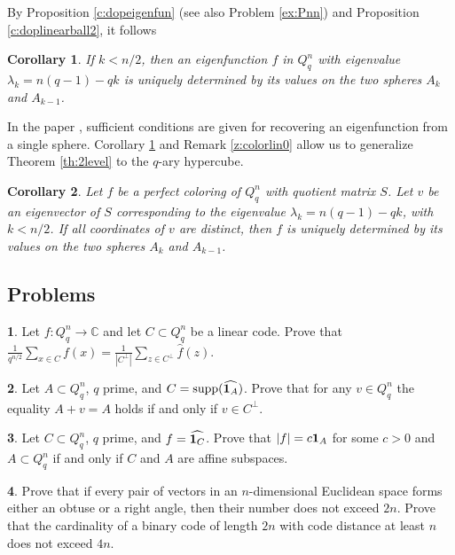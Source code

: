 \documentclass[11pt]{article}
\newtheorem{corollary}{Corollary}[section]
\theoremstyle{definition}
\newtheorem{exercise}{\quad}
\newcommand{\supp}{{\rm supp}}
\begin{document}
{{{By Proposition \ref{c:dopeigenfun}   (see also Problem \ref{ex:Pnn})  and Proposition \ref{c:doplinearball2}, it follows

\begin{corollary}\label{c:doplinearball3}
If $k<n/2$, then an eigenfunction $f$ in $Q^n_q$ with eigenvalue $\lambda_k=n(q-1)-qk$ is uniquely determined by its values on the two spheres $A_{k}$ and $A_{k-1}$.
\end{corollary}

In the paper \cite{Vas15}, sufficient conditions are given for recovering an eigenfunction from a single sphere. Corollary \ref{c:doplinearball3} and Remark \ref{z:colorlin0} allow us to generalize Theorem \ref{th:2level} to the $q$-ary hypercube.


\begin{corollary}
Let $f$ be a perfect coloring of  $Q^n_q$ with quotient matrix $S$. Let $v$ be an eigenvector of $S$ corresponding to the eigenvalue $\lambda_k=n(q-1)-qk$, with $k<n/2$. If all coordinates of $v$ are distinct, then $f$ is uniquely determined by its values on the two spheres $A_{k}$ and $A_{k-1}$.
\end{corollary}


\subsection{Problems}

\begin{exercise}\label{exer2}
Let $f: Q_q^n \rightarrow\mathbb{C}$ and let $C\subset Q_q^n$ be a linear code. Prove that  $\frac{1}{q^{n/2}}\sum\limits_{x\in C}f(x)=\frac{1}{|C^\perp|}\sum\limits_{z\in C^\perp}\widehat{f}(z)$.
\end{exercise}

\begin{exercise}
Let $A\subset Q_q^n$, $q$ prime, and $C=\supp(\widehat{{\bf 1}_A})$. Prove that for any $v\in Q_q^n$ the equality $A+v=A$ holds if and only if $v\in C^\perp$.
\end{exercise}

\begin{exercise}
Let $C\subset Q_q^n$, $q$ prime, and $f=\widehat{{\bf 1}_C}$. Prove that $|f|=c{\bf 1}_A$ for some $c>0$ and $A\subset Q_q^n$ if and only if $C$ and $A$ are affine subspaces.
\end{exercise}

\begin{exercise}
Prove that  if every pair of vectors in an $n$-dimensional Euclidean space forms either an obtuse or a right angle, then their number does not exceed $2n$. Prove that the cardinality of a binary code of length $2n$ with code distance at least $n$ does not exceed $4n$.
\end{exercise}

}}}
\end{document}

